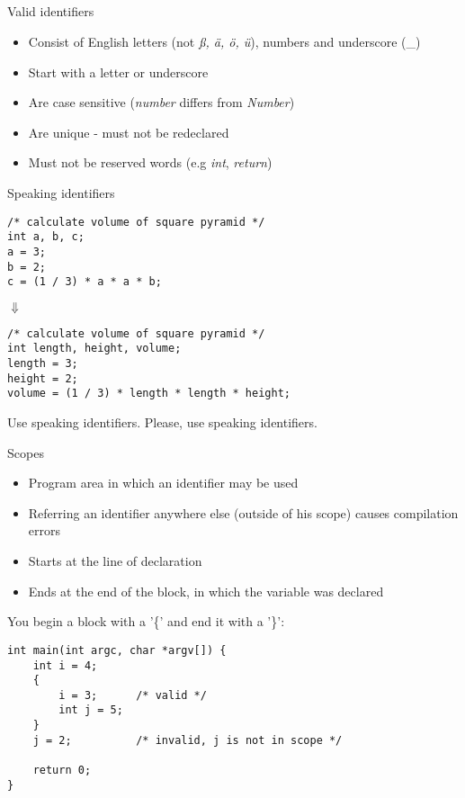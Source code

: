 \subsection{}
\begin{frame}{Valid identifiers}
	\begin{itemize}
		\item Consist of English letters (not \textit{ß, ä, ö, ü}), numbers and
		 underscore (\_)
		\item Start with a letter or underscore
		\item Are case sensitive (\textit{number} differs from \textit{Number})
		\item Are unique - must not be redeclared
		\item Must not be reserved words (e.g \textit{int}, \textit{return})
	\end{itemize}
\end{frame}
\begin{frame}[fragile]{Speaking identifiers}
	\begin{lstlisting}
/* calculate volume of square pyramid */
int a, b, c;
a = 3;
b = 2;
c = (1 / 3) * a * a * b;
\end{lstlisting}
\centering
$\Downarrow$
	\begin{lstlisting}
/* calculate volume of square pyramid */
int length, height, volume;
length = 3;
height = 2;
volume = (1 / 3) * length * length * height;
\end{lstlisting}
\end{frame}
\begin{frame}{Use speaking identifiers.}
	\LARGE
	\centering
	Please, use speaking identifiers.\footnotemark
	
\end{frame}
\begin{frame}[fragile]{Scopes}
	\begin{itemize}
		\item Program area in which an identifier may be used
		\item Referring an identifier anywhere else (outside of his scope) causes
		 compilation errors
		\item Starts at the line of declaration
		\item Ends at the end of the block, in which the variable was declared
	\end{itemize}
	You begin a block with a '\{' and end it with a '\}':
	\begin{lstlisting}
int main(int argc, char *argv[]) {
	int i = 4;
	{
		i = 3;		/* valid */
		int j = 5;
	}
	j = 2;			/* invalid, j is not in scope */
	
	return 0;
}
\end{lstlisting}
\end{frame}
